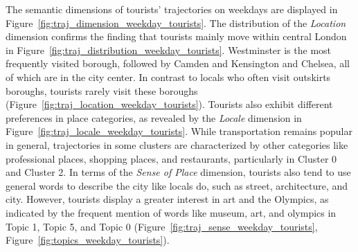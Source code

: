 \documentclass{article}
\theoremstyle{remark}
\begin{document}
The semantic dimensions of tourists' trajectories on weekdays are displayed in Figure~\ref{fig:traj_dimension_weekday_tourists}. 
The distribution of the \textit{Location} dimension confirms the finding that tourists mainly move within central London in Figure~\ref{fig:traj_distribution_weekday_tourists}. Westminster is the most frequently visited borough, followed by Camden and Kensington and Chelsea, all of which are in the city center. In contrast to locals who often visit outskirts boroughs, tourists rarely visit these boroughs (Figure~\ref{fig:traj_location_weekday_tourists}). Tourists also exhibit different preferences in place categories, as revealed by the \textit{Locale} dimension in Figure~\ref{fig:traj_locale_weekday_tourists}. While transportation remains popular in general, trajectories in some clusters are characterized by other categories like professional places, shopping places, and restaurants, particularly in Cluster 0 and Cluster 2. In terms of the \textit{Sense of Place} dimension, tourists also tend to use general words to describe the city like locals do, such as street, architecture, and city. However, tourists display a greater interest in art and the Olympics, as indicated by the frequent mention of words like museum, art, and olympics in Topic 1, Topic 5, and Topic 0 (Figure~\ref{fig:traj_sense_weekday_tourists}, Figure~\ref{fig:topics_weekday_tourists}).
\end{document}
